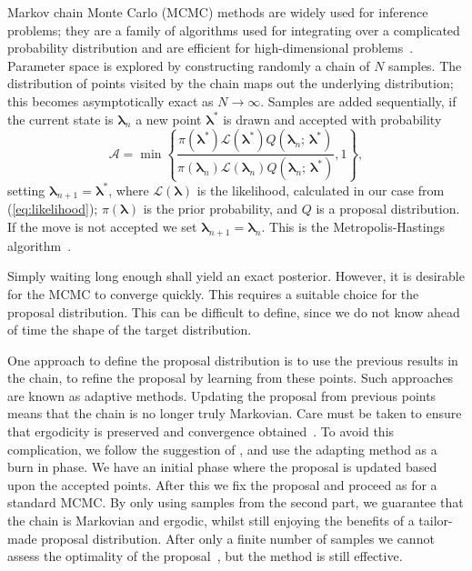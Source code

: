 \documentclass[useAMS,usedcolumn,usegraphicx,usenatbib]{mn2e}
\newcommand{\eqnref}[1]{(\ref{eq:#1})}
\begin{document}
Markov chain Monte Carlo (MCMC) methods are widely used for inference problems; they are a family of algorithms used for integrating over a complicated probability distribution and are efficient for high-dimensional problems~\citep[chapter 29]{MacKay2003}. Parameter space is explored by constructing randomly a chain of $N$ samples. The distribution of points visited by the chain maps out the underlying distribution; this becomes asymptotically exact as $N \rightarrow \infty$. Samples are added sequentially, if the current state is $\boldsymbol{\lambda}_n$ a new point $\boldsymbol{\lambda}^\ast$ is drawn and accepted with probability
\begin{equation}
\mathcal{A} = \min\left\{\frac{\pi(\boldsymbol{\lambda}^\ast)\mathcal{L}(\boldsymbol{\lambda}^\ast)Q(\boldsymbol{\lambda}_n;\,\boldsymbol{\lambda}^\ast)}{\pi(\boldsymbol{\lambda}_n)\mathcal{L}(\boldsymbol{\lambda}_n)Q(\boldsymbol{\lambda}_n;\,\boldsymbol{\lambda}^\ast)}, 1\right\},
\end{equation}
setting $\boldsymbol{\lambda}_{n + 1} = \boldsymbol{\lambda}^\ast$, where $\mathcal{L}(\boldsymbol{\lambda})$ is the  likelihood, calculated in our case from \eqnref{likelihood}; $\pi(\boldsymbol{\lambda})$ is the prior probability, and $Q$ is a proposal distribution. If the move is not accepted we set $\boldsymbol{\lambda}_{n + 1} = \boldsymbol{\lambda}_n$. This is the Metropolis-Hastings algorithm~\citep{Metropolis1953,Hastings1970}.

Simply waiting long enough shall yield an exact posterior. However, it is desirable for the MCMC to converge quickly. This requires a suitable choice for the proposal distribution. This can be difficult to define, since we do not know ahead of time the shape of the target distribution.

One approach to define the proposal distribution is to use the previous results in the chain, to refine the proposal by learning from these points. Such approaches are known as adaptive methods. Updating the proposal from previous points means that the chain is no longer truly Markovian. Care must be taken to ensure that ergodicity is preserved and convergence obtained~\citep{Roberts2007,Andrieu2008}. To avoid this complication, we follow the suggestion of \citet{Haario1999}, and use the adapting method as a burn in phase. We have an initial phase where the proposal is updated based upon the accepted points. After this we fix the proposal and proceed as for a standard MCMC. By only using samples from the second part, we guarantee that the chain is Markovian and ergodic, whilst still enjoying the benefits of a tailor-made proposal distribution. After only a finite number of samples we cannot assess the optimality of the proposal~\citep{Andrieu2008}, but the method is still effective.
\end{document}
